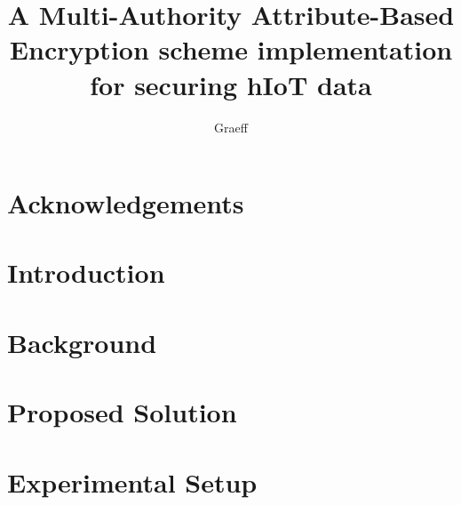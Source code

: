 \documentclass[cic,tc,english]{iiufrgs}
\title{
    A Multi-Authority Attribute-Based Encryption scheme implementation for securing hIoT data
}
\author{Graeff}{Felipe de Almeida}
\begin{document}
\maketitle



\chapter*{Acknowledgements}
    



\begin{abstract}
    
\end{abstract}

\begin{translatedabstract}
    
\end{translatedabstract}





% 

\tableofcontents

\chapter{Introduction}
    

\chapter{Background}
    \label{background}
    
    

\chapter{Proposed Solution}
    \label{proposedsolution}
    


\chapter{Experimental Setup}

\end{document}
